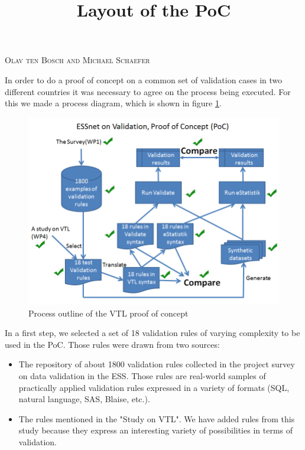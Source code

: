 \title{Layout of the PoC}
\textsc{Olav ten Bosch and Michael Schaefer}
\vspace{0.6cm}

In order to do a proof of concept on a common set of validation cases in two
different countries it was necessary to agree on the process being executed.
For this we made a process diagram, which is shown in figure \ref{pocprocess}.


\begin{figure}[h!]
\begin{center}
\includegraphics[scale=0.5]{20151207ESSnetPoCProcess.PNG} 
\end{center}
\caption{Process outline of the VTL proof of concept}
\label{pocprocess}
\end{figure}

In a first step, we selected a set of 18 validation rules of varying complexity
to be used in the PoC. Those rules were drawn from two sources:

\begin{itemize}
\item
The repository of about 1800 validation rules collected in the project survey on
data validation in the ESS. Those rules are real-world samples of practically
applied validation rules expressed in a variety of formats (SQL, natural language,
SAS, Blaise, etc.).
\item
The rules mentioned in the "Study on VTL". We have added rules from this study
because they express an interesting variety of possibilities in terms of validation.
\end{itemize}

